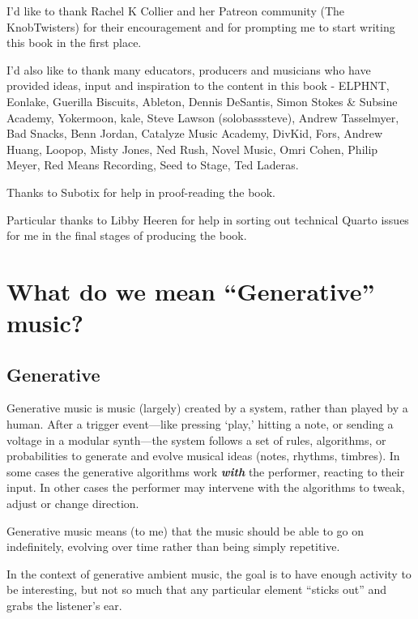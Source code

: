 \documentclass[
  12pt,
  letterpaper,
  oneside,
  open=any]{scrbook}
\begin{document}
I'd like to thank Rachel K Collier and her Patreon community (The
KnobTwisters) for their encouragement and for prompting me to start
writing this book in the first place.

I'd also like to thank many educators, producers and musicians who have
provided ideas, input and inspiration to the content in this book -
ELPHNT, Eonlake, Guerilla Biscuits, Ableton, Dennis DeSantis, Simon
Stokes \& Subsine Academy, Yokermoon, kale, Steve Lawson
(solobasssteve), Andrew Tasselmyer, Bad Snacks, Benn Jordan, Catalyze
Music Academy, DivKid, Fors, Andrew Huang, Loopop, Misty Jones, Ned
Rush, Novel Music, Omri Cohen, Philip Meyer, Red Means Recording, Seed
to Stage, Ted Laderas.

Thanks to Subotix for help in proof-reading the book.

Particular thanks to Libby Heeren for help in sorting out technical
Quarto issues for me in the final stages of producing the book.


\chapter{What do we mean ``Generative''
music?}\label{0000-Defintion-Generative}

\section*{Generative}\label{generative}


Generative music is music (largely) created by a system, rather than
played by a human. After a trigger event---like pressing `play,' hitting
a note, or sending a voltage in a modular synth---the system follows a
set of rules, algorithms, or probabilities to generate and evolve
musical ideas (notes, rhythms, timbres). In some cases the generative
algorithms work \textbf{\emph{with}} the performer, reacting to their
input. In other cases the performer may intervene with the algorithms to
tweak, adjust or change direction.

\begin{tcolorbox}[enhanced jigsaw, breakable, left=2mm, leftrule=.75mm, toprule=.15mm, opacitybacktitle=0.6, toptitle=1mm, coltitle=black, colback=white, colbacktitle=quarto-callout-tip-color!10!white, opacityback=0, rightrule=.15mm, bottomrule=.15mm, titlerule=0mm, title=\textcolor{quarto-callout-tip-color}{\faLightbulb}\hspace{0.5em}{Key idea}, arc=.35mm, bottomtitle=1mm, colframe=quarto-callout-tip-color-frame]

Generative music means (to me) that the music should be able to go on
indefinitely, evolving over time rather than being simply repetitive.

In the context of generative ambient music, the goal is to have enough
activity to be interesting, but not so much that any particular element
``sticks out'' and grabs the listener's ear.

\end{tcolorbox}
\end{document}
